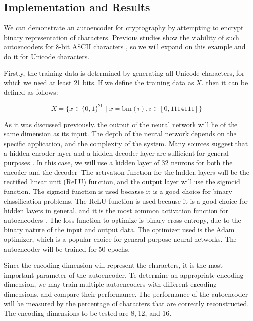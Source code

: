 \subsection{Implementation and Results}

We can demonstrate an autoencoder for cryptography by attempting to encrypt binary representation of characters. Previous studies show the viability of such autoencoders for 8-bit ASCII characters \cite{icaart20}, so we will expand on this example and do it for Unicode characters.

Firstly, the training data is determined by generating all Unicode characters, for which we need at least 21 bits. If we define the training data as $X$, then it can be defined as follows:

\begin{equation}
    X = \{x \in \{0,1\}^{21} \mid x = \text{bin}(i), i \in [0, 1114111]\}
\end{equation}

As it was discussed previously, the output of the neural network will be of the same dimension as its input. The depth of the neural network depends on the specific application, and the complexity of the system. Many sources suggest that a hidden encoder layer and a hidden decoder layer are sufficient for general purposes \cite{autoencoder2}. In this case, we will use a hidden layer of 32 neurons for both the encoder and the decoder. The activation function for the hidden layers will be the rectified linear unit (ReLU) function, and the output layer will use the sigmoid function. The sigmoid function is used because it is a good choice for binary classification problems. The ReLU function is used because it is a good choice for hidden layers in general, and it is the most common activation function for autoencoders \cite{autoencoder3}. The loss function to optimize is binary cross entropy, due to the binary nature of the input and output data. The optimizer used is the Adam optimizer, which is a popular choice for general purpose neural networks. The autoencoder will be trained for 50 epochs.

Since the encoding dimension will represent the characters, it is the most important parameter of the autoencoder. To determine an appropriate encoding dimension, we may train multiple autoencoders with different encoding dimensions, and compare their performance. The performance of the autoencoder will be measured by the percentage of characters that are correctly reconstructed. The encoding dimensions to be tested are 8, 12, and 16.

